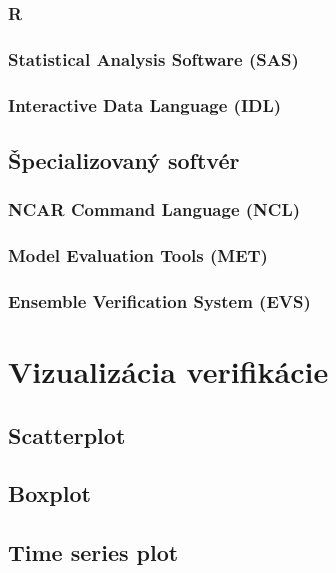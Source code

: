 \subsubsection{R}

\subsubsection[SAS]{Statistical Analysis Software (SAS)}

\subsubsection[IDL]{Interactive Data Language (IDL)}

\subsection{Špecializovaný softvér}

\subsubsection[NCL]{NCAR Command Language (NCL)}

\subsubsection[MET]{Model Evaluation Tools (MET)}

\subsubsection[EVS]{Ensemble Verification System (EVS)}



\section{Vizualizácia verifikácie}

\subsection{Scatterplot}

\subsection{Boxplot}

\subsection{Time series plot}